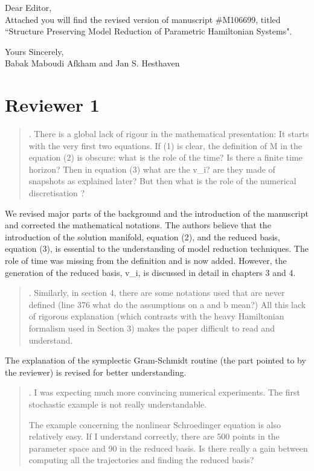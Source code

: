 \documentclass[a4paper]{article}
\newcommand{\breview}{\begin{quotation}\begin{bf}\noindent}
\newcommand{\ereview}{\end{bf}\end{quotation}}
\begin{document}
Dear Editor, \\[1cm]

Attached you will find the revised version of manuscript \#M106699, titled ``Structure Preserving Model Reduction of Parametric Hamiltonian Systems".

Yours Sincerely,\\[1.0cm]
Babak Maboudi Afkham and
Jan S. Hesthaven
\\[1cm]

\section*{Reviewer 1}

\breview
1. There is a global lack of rigour in the mathematical presentation: It starts with the very first two equations. If (1) is clear, the definition of M in the equation (2) is obscure: what is the role of the time? Is there a finite time horizon? Then in equation (3) what are the v\_i? are they made of snapshots as explained later? But then what is the role of the numerical discretisation ?
\ereview

We revised major parts of the background and the introduction of the manuscript and corrected the mathematical notations. The authors believe that the introduction of the solution manifold, equation (2), and the reduced basis, equation (3), is essential to the understanding of model reduction techniques. The role of time was missing from the definition and is now added. However, the generation of the reduced basis, v\_i, is discussed in detail in chapters 3 and 4.

\breview
2. Similarly, in section 4, there are some notations used that are never defined (line 376 what do the assumptions on a and b mean?) All this lack of rigorous explanation (which contrasts with the heavy Hamiltonian formalism used in Section 3) makes the paper difficult to read and understand. 
\ereview

The explanation of the symplectic Gram-Schmidt routine (the part pointed to by the reviewer) is revised for better understanding.

\breview
3. I was expecting much more convincing numerical experiments. The first stochastic example is not really understandable.

The example concerning the nonlinear Schroedinger equation is also relatively easy. If I understand correctly, there are 500 points in the parameter space and 90 in the reduced basis. Is there really a gain between computing all the trajectories and finding the reduced basis?
\ereview
\end{document}
